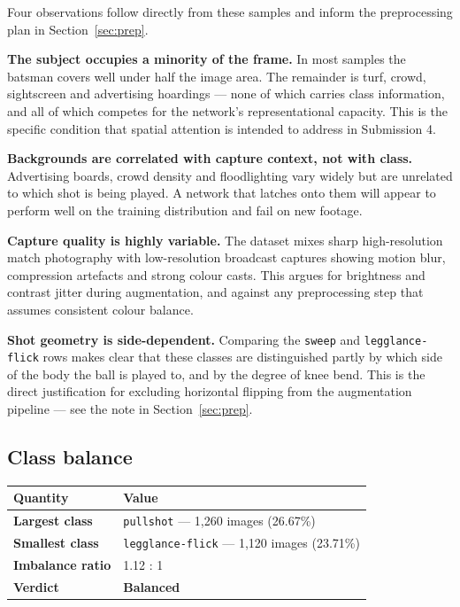 \documentclass[11pt,a4paper]{article}
\begin{document}
Four observations follow directly from these samples and inform the preprocessing plan
in Section~\ref{sec:prep}.

\textbf{The subject occupies a minority of the frame.} In most samples the batsman
covers well under half the image area. The remainder is turf, crowd, sightscreen and
advertising hoardings --- none of which carries class information, and all of which
competes for the network's representational capacity. This is the specific condition
that spatial attention is intended to address in Submission 4.

\textbf{Backgrounds are correlated with capture context, not with class.} Advertising
boards, crowd density and floodlighting vary widely but are unrelated to which shot is
being played. A network that latches onto them will appear to perform well on the
training distribution and fail on new footage.

\textbf{Capture quality is highly variable.} The dataset mixes sharp high-resolution
match photography with low-resolution broadcast captures showing motion blur,
compression artefacts and strong colour casts. This argues for brightness and contrast
jitter during augmentation, and against any preprocessing step that assumes consistent
colour balance.

\textbf{Shot geometry is side-dependent.} Comparing the \texttt{sweep} and
\texttt{legglance-flick} rows makes clear that these classes are distinguished partly by
which side of the body the ball is played to, and by the degree of knee bend. This is
the direct justification for excluding horizontal flipping from the augmentation
pipeline --- see the note in Section~\ref{sec:prep}.

\subsection{Class balance}

\begin{tabularx}{\linewidth}{@{}>{\bfseries}p{6.2cm}X@{}}
\toprule
Quantity & Value \\
\midrule
Largest class & \texttt{pullshot} --- 1{,}260 images (26.67\%) \\
Smallest class & \texttt{legglance-flick} --- 1{,}120 images (23.71\%) \\
Imbalance ratio & 1.12 : 1 \\
Verdict & \textbf{Balanced} \\
\bottomrule
\end{tabularx}
\end{document}

